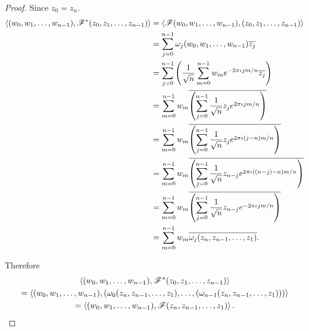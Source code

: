 \begin{proof}
    Since $z_{0} = z_{n}$.
    \begingroup
    \allowdisplaybreaks{}
    \begin{align*}
        \left\langle{(w_{0}, w_{1}, \ldots, w_{n-1}), \mathscr{F}^{*}(z_{0}, z_{1}, \ldots, z_{n-1})}\right\rangle & = \left\langle{\mathscr{F}(w_{0}, w_{1}, \ldots, w_{n-1}), (z_{0}, z_{1}, \ldots, z_{n-1})}\right\rangle                          \\
                                                                                                    & = \sum^{n-1}_{j=0}\omega_{j}(w_{0}, w_{1}, \ldots, w_{n-1})\overline{z_{j}}                                            \\
                                                                                                    & = \sum^{n-1}_{j=0}\left(\frac{1}{\sqrt{n}}\sum^{n-1}_{m=0}w_{m}e^{-2\pi\iota jm/n}\overline{z_{j}}\right)              \\
                                                                                                    & = \sum^{n-1}_{m=0}w_{m}\overline{\left(\sum^{n-1}_{j=0}\frac{1}{\sqrt{n}}z_{j}e^{2\pi\iota jm/n}\right)}               \\
                                                                                                    & = \sum^{n-1}_{m=0}w_{m}\overline{\left(\sum^{n-1}_{j=0}\frac{1}{\sqrt{n}}z_{j}e^{2\pi\iota (j - n)m/n}\right)}         \\
                                                                                                    & = \sum^{n-1}_{m=0}w_{m}\overline{\left(\sum^{n-1}_{j=0}\frac{1}{\sqrt{n}}z_{n-j}e^{2\pi\iota ((n - j) - n)m/n}\right)} \\
                                                                                                    & = \sum^{n-1}_{m=0}w_{m}\overline{\left(\sum^{n-1}_{j=0}\frac{1}{\sqrt{n}}z_{n-j}e^{-2\pi\iota jm/n}\right)}            \\
                                                                                                    & = \sum^{n-1}_{m=0}w_{m}\overline{\omega_{j}(z_{n}, z_{n-1}, \ldots, z_{1})}.
    \end{align*}
    \endgroup

    Therefore
    \begin{multline*}
        \left\langle{(w_{0}, w_{1}, \ldots, w_{n-1}), \mathscr{F}^{*}(z_{0}, z_{1}, \ldots, z_{n-1})}\right\rangle \\
        = \left\langle{(w_{0}, w_{1}, \ldots, w_{n-1}), (\omega_{0}(z_{n}, z_{n-1}, \ldots,z_{1}), \ldots, (\omega_{n-1}(z_{n}, z_{n-1}, \ldots,z_{1})))}\right\rangle \\
        = \left\langle{(w_{0}, w_{1}, \ldots, w_{n-1}), \mathscr{F}(z_{n}, z_{n-1}, \ldots, z_{1})}\right\rangle.
    \end{multline*}


\end{proof}
